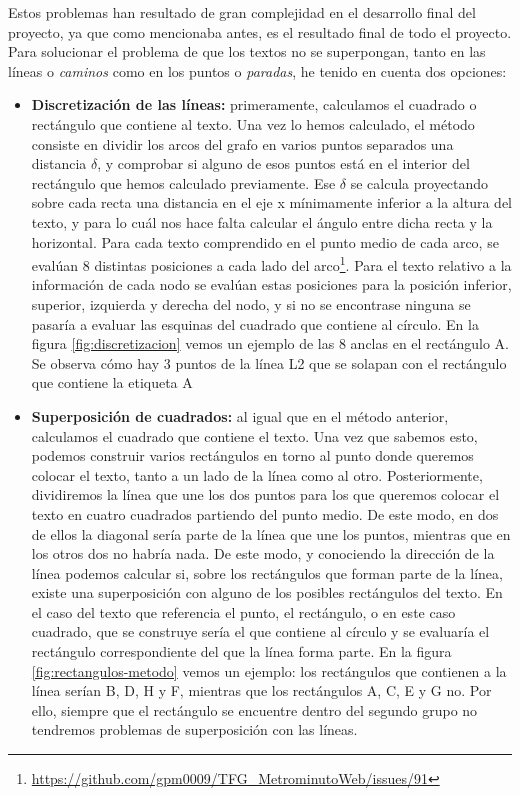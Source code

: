 Estos problemas han resultado de gran complejidad en el desarrollo final del proyecto, ya que como mencionaba antes, es el resultado final de todo el proyecto. Para solucionar el problema de que los textos no se superpongan, tanto en las líneas o \textit{caminos} como en los puntos o \textit{paradas}, he tenido en cuenta dos opciones:
\begin{itemize}
	\item \textbf{Discretización de las líneas:} primeramente, calculamos el cuadrado o rectángulo que contiene al texto. Una vez lo hemos calculado, el método consiste en dividir los arcos del grafo en varios puntos separados una distancia $\delta$, y comprobar si alguno de esos puntos está en el interior del rectángulo que hemos calculado previamente. Ese $\delta$ se calcula proyectando sobre cada recta una distancia en el eje x mínimamente inferior a la altura del texto, y para lo cuál nos hace falta calcular el ángulo entre dicha recta y la horizontal. Para cada texto comprendido en el punto medio de cada arco, se evalúan 8 distintas posiciones a cada lado del arco\footnote{\url{https://github.com/gpm0009/TFG_MetrominutoWeb/issues/91}}. Para el texto relativo a la información de cada nodo se evalúan estas posiciones para la posición inferior, superior, izquierda y derecha del nodo, y si no se encontrase ninguna se pasaría a evaluar las esquinas del cuadrado que contiene al círculo. En la figura \ref{fig:discretizacion} vemos un ejemplo de las 8 anclas en el rectángulo A. 
	Se observa cómo hay 3 puntos de la línea L2 que se solapan con el rectángulo que contiene la etiqueta A
	
	\item \textbf{Superposición de cuadrados:} al igual que en el método anterior, calculamos el cuadrado que contiene el texto. Una vez que sabemos esto, podemos construir varios rectángulos en torno al punto donde queremos colocar el texto, tanto a un lado de la línea como al otro. Posteriormente, dividiremos la línea que une los dos puntos para los que queremos colocar el texto en cuatro cuadrados partiendo del punto medio. De este modo, en dos de ellos la diagonal sería parte de la línea que une los puntos, mientras que en los otros dos no habría nada. De este modo, y conociendo la dirección de la línea podemos calcular si, sobre los rectángulos que forman parte de la línea, existe una superposición con alguno de los posibles rectángulos del texto. En el caso del texto que referencia el punto, el rectángulo, o en este caso cuadrado, que se construye sería el que contiene al círculo y se evaluaría el rectángulo correspondiente del que la línea forma parte. En la figura \ref{fig:rectangulos-metodo} vemos un ejemplo: los rectángulos que contienen a la línea serían B, D, H y F, mientras que los rectángulos A, C, E y G no. Por ello, siempre que el rectángulo se encuentre dentro del segundo grupo no tendremos problemas de superposición con las líneas.
\end{itemize}
